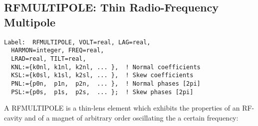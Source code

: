 





\subsection{RFMULTIPOLE: Thin Radio-Frequency Multipole}
\begin{verbatim}
Label:  RFMULTIPOLE, VOLT=real, LAG=real,
  HARMON=integer, FREQ=real,
  LRAD=real, TILT=real,
  KNL:={k0nl, k1nl, k2nl, ... },  ! Normal coefficients
  KSL:={k0sl, k1sl, k2sl, ... },  ! Skew coefficients
  PNL:={p0n,  p1n,  p2n,  ... },  ! Normal phases [2pi]
  PSL:={p0s,  p1s,  p2s,  ... };  ! Skew phases [2pi]
    \end{verbatim} A RFMULTIPOLE is a thin-lens element which       exhibits the properties of an RF-cavity and of a magnet of       arbitrary order oscillating the a certain frequency:       


